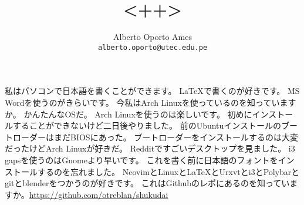 \documentclass[12pt, twoside]{article}
\title{\textbf{<++>}}
\author{
		Alberto Oporto Ames\\
		\texttt{alberto.oporto@utec.edu.pe}\\
		}
\begin{document}
\thispagestyle{fancy}
私はパソコンで日本語を書くことができます。
\LaTeX で書くのが好きです。
MS Wordを使うのがきらいです。
今私はArch Linuxを使っているのを知っていますか。
かんたんなOSだ。
Arch Linuxを使うのは楽しいです。
初めにインストールすることができないけど二日後やりました。
前のUbuntuインストールのブートローダーはまだBIOSにあった。
ブートローダーをインストールするのは大変だったけどArch Linuxが好きだ。
Redditですごいデスクトップを見ました。
i3 gapsを使うのはGnomeより早いです。
これを書く前に日本語のフォントをインストールするのを忘れました。
NeovimとLinuxと\LaTeX とUrxvtとi3とPolybarとgitとblenderをつかうのが好きです。
これはGithubのレポにあるのを知っていますか。\url{https://github.com/otreblan/shukudai}
\end{document}
